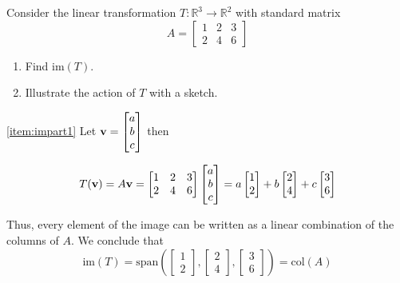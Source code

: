 \documentclass{ximera}
\renewcommand{\vec}[1]{{\bf #1}}
\newcommand{\RR}{\mathbb{R}}
\begin{document}
\begin{example}\label{ex:image1}
Consider the linear transformation $T:\RR^3\rightarrow \RR^2$ with standard matrix
$$A=\begin{bmatrix}1&2&3\\2&4&6\end{bmatrix}$$

\begin{enumerate}
\item\label{item:impart1}
Find $\text{im}(T)$.
\item\label{item:impart2}
Illustrate the action of $T$ with a sketch.

\end{enumerate}
\begin{explanation}

\ref{item:impart1} Let $\vec{v}=\begin{bmatrix}a\\b\\c\end{bmatrix}$ then

$$T(\vec{v})=A\vec{v}=\begin{bmatrix}1&2&3\\2&4&6\end{bmatrix}\begin{bmatrix}a\\b\\c\end{bmatrix}=a\begin{bmatrix}1\\2\end{bmatrix}+b\begin{bmatrix}2\\4\end{bmatrix}+c\begin{bmatrix}3\\6\end{bmatrix}$$

Thus, every element of the image can be written as a linear combination of the columns of $A$.  We conclude that 
$$\text{im}(T)=\text{span}\left(\begin{bmatrix}1\\2\end{bmatrix}, \begin{bmatrix}2\\4\end{bmatrix}, \begin{bmatrix}3\\6\end{bmatrix}\right)=\text{col}(A)$$


\end{explanation}
\end{example}
\end{document}
